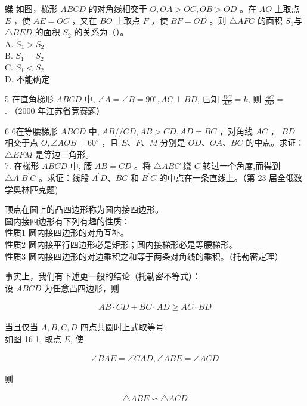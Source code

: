 \documentclass[10pt]{article}
\begin{document}
蝶 如图，梯形 $A B C D$ 的对角线相交于 $O, O A>O C, O B>O D$ 。在 $A O$ 上取点 $E$ ，使 $A E=O C$ ，又在 $B O$ 上取点 $F$ ，使 $B F=O D$ 。则 $\triangle A F C$ 的面积 $S_{1}$与 $\triangle B E D$ 的面积 $S_{2}$ 的关系为（）。\\
A. $S_{1}>S_{2}$\\
B. $S_{1}=S_{2}$\\
C. $S_{1}<S_{2}$\\
D. 不能确定

5 在直角梯形 $A B C D$ 中, $\angle A=\angle B=90^{\circ}, A C \perp B D$, 已知 $\frac{B C}{A D}=k$, 则 $\frac{A C}{B D}=$ $\qquad$ . （2000 年江苏省竞赛题）

6 6在等腰梯形 $A B C D$ 中, $A B / / C D, A B>C D, A D=B C$ ，对角线 $A C$ ， $B D$ 相交于点 $O, \angle A O B=60^{\circ}$ ，且 $E 、 F 、 M$ 分别是 $O D 、 O A 、 B C$ 的中点。求证： $\triangle E F M$ 是等边三角形。\\
7. 在梯形 $A B C D$ 中, 腰 $A B=C D$ 。将 $\triangle A B C$ 绕 $C$ 转过一个角度,而得到 $\triangle A^{\prime} B^{\prime} C$ 。求证：线段 $A^{\prime} D 、 B C$ 和 $B^{\prime} C$ 的中点在一条直线上。（第 23 届全俄数学奥林匹克题)

顶点在圆上的凸四边形称为圆内接四边形。\\
圆内接四边形有下列有趣的性质：\\
性质1 圆内接四边形的对角互补。\\
性质2 圆内接平行四边形必是矩形；圆内接梯形必是等腰梯形。\\
性质3 圆内接四边形的对边乘积之和等于两条对角线的乘积。（托勒密定理）

事实上，我们有下述更一般的结论（托勒密不等式）：\\
设 $A B C D$ 为任意凸四边形，则

\begin{align*}
A B \cdot C D+B C \cdot A D \geqslant A C \cdot B D
\end{align*}

当且仅当 $A, B, C, D$ 四点共圆时上式取等号.\\
如图 16-1, 取点 $E$, 使

\begin{align*}
\angle B A E=\angle C A D, \angle A B E=\angle A C D
\end{align*}

则

\begin{align*}
\triangle A B E \backsim \triangle A C D
\end{align*}
\end{document}
